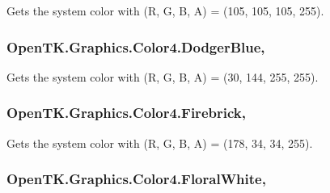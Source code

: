 Gets the system color with (R, G, B, A) = (105, 105, 105, 255). 

\hypertarget{struct_open_t_k_1_1_graphics_1_1_color4_abc1d257e86234a6c16b8c4c13c7dfda9}{
\subsubsection[{Dodger\-Blue}]{ Open\-T\-K.\-Graphics.\-Color4.\-Dodger\-Blue\hspace{0.3cm}{\ttfamily [static]}, {\ttfamily [get]}}}\label{struct_open_t_k_1_1_graphics_1_1_color4_abc1d257e86234a6c16b8c4c13c7dfda9}


Gets the system color with (R, G, B, A) = (30, 144, 255, 255). 

\hypertarget{struct_open_t_k_1_1_graphics_1_1_color4_a47917d436fb1cb3d26ccbf4946bfba26}{
\subsubsection[{Firebrick}]{ Open\-T\-K.\-Graphics.\-Color4.\-Firebrick\hspace{0.3cm}{\ttfamily [static]}, {\ttfamily [get]}}}\label{struct_open_t_k_1_1_graphics_1_1_color4_a47917d436fb1cb3d26ccbf4946bfba26}


Gets the system color with (R, G, B, A) = (178, 34, 34, 255). 

\hypertarget{struct_open_t_k_1_1_graphics_1_1_color4_a2ca0f95c8487831833e2785edbe1a379}{
\subsubsection[{Floral\-White}]{ Open\-T\-K.\-Graphics.\-Color4.\-Floral\-White\hspace{0.3cm}{\ttfamily [static]}, {\ttfamily [get]}}}\label{struct_open_t_k_1_1_graphics_1_1_color4_a2ca0f95c8487831833e2785edbe1a379}


